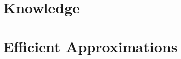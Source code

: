 \documentclass[11pt]{article}
\begin{document}
\section*{Knowledge}

\section{Efficient Approximations}
\end{document}
